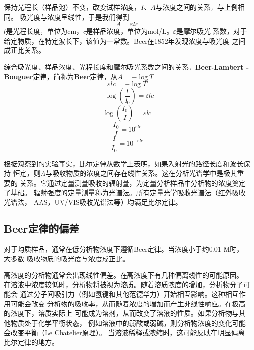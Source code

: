 保持光程长（样品池）不变，改变试样浓度，$I$、$A$与浓度之间的关系，与上例相同。
吸光度与浓度呈线性，于是我们得到
\begin{equation}
    A = \varepsilon l c
    \label{2.9}
\end{equation}
$l$是光程长度，单位为cm，$c$是样品浓度，单位为mol/L。$\varepsilon$是摩尔吸光
系数，对于给定物质，在特定波长下，该值为一常数。Beer在1852年发现浓度与吸光度
之间成正比关系。

综合吸光度、样品浓度、光程长度和摩尔吸光系数之间的关系，{\bf Beer-Lambert
-Bouguer}定律，简称为{\bf Beer}定律，从$A=-\log{T}$
\begin{equation}
    \varepsilon l c = -\log{T}
\end{equation}
\begin{equation}
    -\log{\left(\frac{I}{I_0}\right)}=\varepsilon l c 
\end{equation}
\begin{equation}
    \log{\left(\frac{I_0}{I}\right)}=\varepsilon l c 
\end{equation}
\begin{equation}
    \frac{I_0}{I}=10^{\varepsilon l c }
\end{equation}
\begin{equation}
    \frac{I}{I_0}=10^{-\varepsilon l c }
\end{equation}

根据观察到的实验事实，比尔定律从数学上表明，如果入射光的路径长度和波长保持
恒定，则$A$与吸收物质的浓度之间存在线性关系。这在分析光谱学中是极其重要的
关系。它通过定量测量吸收的辐射量，为定量分析样品中分析物的浓度奠定了基础。
辐射强度的定量测量称为光谱法。所有定量光学吸收光谱法（红外吸收光谱法，
AAS，UV/VIS吸收光谱法等）均满足比尔定律。
\subsection{Beer定律的偏差}
对于均质样品，通常在低分析物浓度下遵循Beer定律。当浓度小于约0.01 M时，大多数
吸收物质的吸光度与浓度成正比。

高浓度的分析物通常会出现线性偏差。在高浓度下有几种偏离线性的可能原因。
在溶液中浓度较低时，分析物将被视为溶质。随着溶质浓度的增加，分析物分子可能会
通过分子间吸引力（例如氢键和其他范德华力）开始相互影响。这种相互作用可能会改变
分析物的吸收率，从而随着浓度的增加而产生非线性响应。在极高的浓度下，溶质实际上
可能成为溶剂，从而改变了溶液的性质。如果分析物与其他物质处于化学平衡状态，
例如溶液中的弱酸或弱碱，则分析物浓度的变化可能会改变平衡（Le Chatelier原理）。
当溶液稀释或浓缩时，这可能反映在明显偏离比尔定律的地方。

